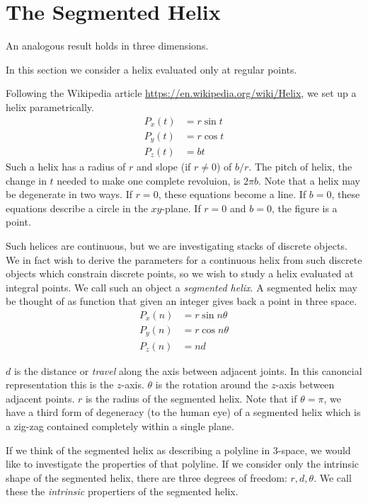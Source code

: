 \documentclass[11pt]{article}
\begin{document}
{\label{sec:2d}

\section{The Segmented Helix}

An analogous result holds in three dimensions.

In this section we consider a helix evaluated only at regular points.

Following the Wikipedia article \url{https://en.wikipedia.org/wiki/Helix}, we set up a helix parametrically.
\begin{align*}
    P_x(t) &= r \sin{t}  \\
    P_y(t) &= r \cos{t} \\
   P_z(t) &= b t
\end{align*}
Such a helix has a radius of $r$ and slope (if $r \neq 0$) of $b/r$.
The pitch of helix, the change in $t$ needed to make one complete revoluion, is $2\pi b$.
Note that a helix may be degenerate in two ways.
If $r = 0$, these equations become a line. If $b = 0$, these equations describe a circle in the $xy$-plane.
If $r = 0$ and $b = 0$, the figure is a point.

Such helices are continuous, but we are investigating stacks of discrete objects. We in fact wish to derive
the parameters for a continuous helix from such discrete objects which constrain discrete points, so we wish
to study a helix evaluated at integral points. We call such an object a {\em segmented helix}.
A segmented helix may be thought of as function that given an integer gives back a point in three space.
\begin{align*}
    P_x(n) &= r \sin{n \theta}  \\
    P_y(n) &= r \cos{n \theta} \\
   P_z(n) &= n d
\end{align*}

$d$ is the distance or {\em travel} along the axis between adjacent joints. In this canoncial representation this is
the $z$-axis.
$\theta$ is the rotation around the $z$-axis
between adjacent points.
$r$ is the radius of the segmented helix.
Note that if $\theta = \pi$, we have a third form of degeneracy (to the human eye) of a segmented helix
which is a zig-zag contained completely within a single plane.

If we think of the segmented helix as describing a polyline in 3-space, we would like to investigate
the properties of that polyline. If we consider only the intrinsic shape of the segmented helix, there are three degrees
of freedom: $r,d,\theta$. We call these the {\em intrinsic} propertiers of the segmented helix.

}
\end{document}
